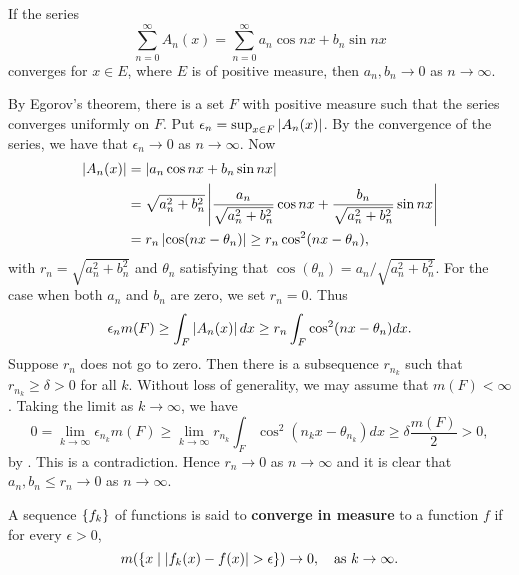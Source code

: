 \begin{problem}
    If the series 
    \begin{equation*}
        \sum_{n=0}^{\infty} A_n(x) = \sum_{n=0}^{\infty} a_n\cos nx + b_n\sin nx
    \end{equation*}
    converges for $x\in E$, where $E$ is of positive measure, then $a_n,b_n\to 0$ as $n\to\infty$.
\end{problem}
\begin{pf}
    By Egorov's theorem, there is a set $F$ with positive measure such that 
    the series converges uniformly on $F$. Put $\epsilon_n = \sup_{x\in F}\left\lvert {A_n(x)} \right\rvert$. 
    By the convergence of the series, we have that $\epsilon_n\to 0$ as $n\to\infty$. 
    Now 
    \begin{equation*}
        \begin{split}
            \left\lvert {A_n(x)} \right\rvert &= \left\lvert {a_n\cos nx + b_n\sin nx} \right\rvert \\
            &= \sqrt{a_n^2 + b_n^2}\left\lvert {\frac{a_n}{\sqrt{a_n^2 + b_n^2}}\cos nx + \frac{b_n}{\sqrt{a_n^2 + b_n^2}}\sin nx} \right\rvert \\
            &= r_n\left\lvert {\cos(nx - \theta_n)} \right\rvert \geq r_n \cos^2(nx - \theta_n),
        \end{split}
    \end{equation*}
    with $r_n = \sqrt{a_n^2 + b_n^2}$ and $\theta_n$ satisfying that $\cos(\theta_n) = a_n/\sqrt{a_n^2 + b_n^2}$. 
    For the case when both $a_n$ and $b_n$ are zero, we set $r_n = 0$. Thus 
    \begin{equation*}
        \epsilon_nm(F) \geq \int_F \left\lvert {A_n(x)} \right\rvert dx \geq r_n\int_F \cos^2(nx - \theta_n)dx.
    \end{equation*}
    Suppose $r_n$ does not go to zero. Then there is a subsequence $r_{n_k}$ such that 
    $r_{n_k} \geq \delta > 0$ for all $k$. Without loss of generality, we may assume that 
    $m(F) < \infty$. Taking the limit as $k\to\infty$, we have 
    \begin{equation*}
        0 = \lim_{k\to\infty}\epsilon_{n_k}m(F) \geq \lim_{k\to\infty}r_{n_k}\int_F \cos^2(n_{k}x - \theta_{n_k})dx \geq \delta \frac{m(F)}{2} > 0,
    \end{equation*}
    by . This is a contradiction. Hence $r_n\to 0$ as $n\to\infty$ and 
    it is clear that $a_n, b_n\leq r_n\to 0$ as $n\to\infty$.
\end{pf}

\begin{definition}
    A sequence $\left\{ {f_k} \right\}$ of functions is said to \textbf{converge in measure} to a function $f$ 
    if for every $\epsilon > 0$, 
    \begin{equation*}
        m\pth{\Set{x}{\abs{f_k(x) - f(x)} > \epsilon}} \to 0, \quad \text{as } k\to\infty.
    \end{equation*}
\end{definition}

